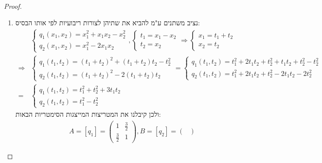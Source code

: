 \documentclass{article}
\begin{document}
\begin{proof}
\begin{enumerate}
            \item נציב משתנים ע"מ להביא את שתיהן לצורות ריבועיות לפי אותו הבסיס:
            \begin{align*}
                &\begin{cases}
                    q_1(x_1, x_2) = x_1^2 + x_1x_2 - x_2^2 \\
                    q_2(x_1, x_2) = x_1^2 - 2x_1x_2
                \end{cases},
                \begin{cases}
                    t_1 = x_1 - x_2 \\
                    t_2 = x_2
                \end{cases} \Rightarrow
                \begin{cases}
                    x_1 = t_1 + t_2 \\
                    x_2 = t_2
                \end{cases} \\
                \Rightarrow
                &\begin{cases}
                    q_1(t_1, t_2) = (t_1 + t_2)^2 + (t_1 + t_2)t_2 - t_2^2 \\
                    q_2(t_1, t_2) = (t_1 + t_2)^2 - 2(t_1 + t_2)t_2
                \end{cases}
                = \begin{cases}
                    q_1(t_1, t_2) = t_1^2 + 2t_1t_2 + t_2^2 + t_1t_2 + t_2^2 - t_2^2 \\
                    q_2(t_1, t_2) = t_1^2 + 2t_1t_2 + t_2^2 - 2t_1t_2 - 2t_2^2
                \end{cases} \\
                = &\begin{cases}
                    q_1(t_1, t_2) = t_1^2 + t_2^2 + 3t_1t_2 \\
                    q_2(t_1, t_2) = t_1^2 - t_2^2
                \end{cases}
            \end{align*}
            ולכן קיבלנו את המטריצות המייצגות הסימטריות הבאות:
            \begin{align*}
                A = [q_1] =
                \begin{pmatrix}
                    1 & \frac{3}{2} \\
                    \frac{3}{2} & 1
                \end{pmatrix},
                B = [q_2] =
                \begin{pmatrix}

\end{pmatrix}
\end{align*}
\end{enumerate}
\end{proof}
\end{document}

